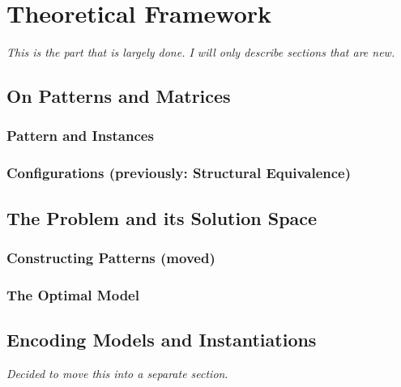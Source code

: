 \documentclass[a4paper,notoc,oneside]{tufte-book}
\begin{document}
\chapter{Theoretical Framework}

\emph{This is the part that is largely done. I will only describe sections that are new.}

\section{On Patterns and Matrices}
\subsection{Pattern and Instances}
\subsection{Configurations (previously: Structural Equivalence)}

\section{The Problem and its Solution Space}
\subsection{Constructing Patterns (moved)}
\subsection{The Optimal Model}

\section{Encoding Models and Instantiations}

\emph{Decided to move this into a separate section}. 
\end{document}
